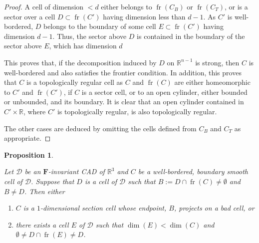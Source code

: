\documentclass[
]{book}
\providecommand{\tightlist}{%
  \setlength{\itemsep}{0pt}\setlength{\parskip}{0pt}}
\newtheorem{proposition}{Proposition}[chapter]
\theoremstyle{definition}
\theoremstyle{definition}
\theoremstyle{definition}
\theoremstyle{definition}
\theoremstyle{remark}
\begin{document}
\begin{proof}
A cell of dimension \(< d\) either belongs to \({\operatorname{fr} \left( C_B \right)}\) or \({\operatorname{fr} \left( C_T \right)}\), or is a sector over a cell \(D \subset {\operatorname{fr} \left( C' \right)}\) having dimension less than \(d-1\).
As \(C'\) is well-bordered, \(D\) belongs to the boundary of some cell \(E \subset {\operatorname{fr} \left( C' \right)}\) having dimension \(d-1\).
Thus, the sector above \(D\) is contained in the boundary of the sector above \(E\), which has dimension \(d\)

This proves that, if the decomposition induced by \(D\) on \(\mathbb{R}^{n-1}\) is strong, then \(C\) is well-bordered and also satisfies the frontier condition. In addition, this proves that \(C\) is a topologically regular cell as \(C\) and \({\operatorname{fr} \left( C \right)}\) are either homeomorphic to \(C'\) and \({\operatorname{fr} \left( C' \right)}\), if \(C\) is a sector cell, or to an open cylinder, either bounded or unbounded, and its boundary. It is clear that an open cylinder contained in \(C' \times \mathbb{R}\), where \(C'\) is topologically regular, is also topologically regular.

The other cases are deduced by omitting the cells defined from \(C_B\) and \(C_T\) as appropriate.
\end{proof}

\begin{proposition}
\protect\hypertarget{prp:lazard-5-13}{}\label{prp:lazard-5-13}

\citep[ Proposition 5.13]{lazard10}

Let \(\mathcal{D}\) be an \(\mathbf{F}\)-invariant CAD of \(\mathbb{R}^3\) and \(C\) be a well-bordered, boundary smooth cell of \(\mathcal{D}\).
Suppose that \(D\) is a cell of \(\mathcal{D}\) such that \(B := D \cap {\operatorname{fr} \left(  C  \right)} \neq \emptyset\) and \(B \neq D\). Then either

\begin{enumerate}
\def\labelenumi{\arabic{enumi}.}
\tightlist
\item
  \(C\) is a \(1\)-dimensional section cell whose endpoint, \(B\), projects on a bad cell, or
\item
  there exists a cell \(E\) of \(\mathcal{D}\) such that \(\dim(E) < \dim(C)\) and \(\emptyset \neq D \cap {\operatorname{fr} \left(  E  \right)} \neq D\).
\end{enumerate}

\end{proposition}
\end{document}
